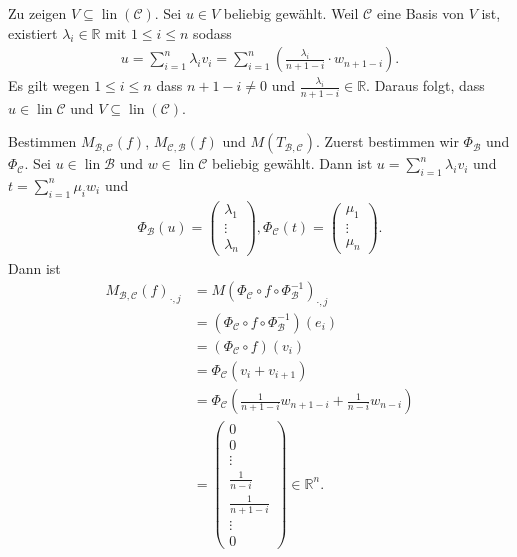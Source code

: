 \documentclass[12pt]{extarticle}
\newcommand{\mg}[1]{\mathbb{#1}}
\newcommand{\mc}[1]{\mathcal{#1}}
\newcommand{\lin}{\operatorname{lin}}
\begin{document}
Zu zeigen \(V \subseteq \lin(\mc{C})\).  Sei \(u \in V\)
beliebig gewählt.  Weil \(\mc{C}\) eine Basis von \(V\) ist, existiert
\(\lambda_i \in \mg{R}\) mit \(1 \le i \le n\) sodass
\begin{align*}
u = \sum_{i=1}^n{\lambda_i v_i} = \sum_{i =
  1}^n{\left( \frac{\lambda_i}{n+1-i} \cdot w_{n+1-i}  \right)}.
\end{align*}
Es gilt wegen \(1 \le i \le n\) dass \(n+1-i \ne 0\) und
\(\frac{\lambda_i}{n+1-i} \in \mg{R}\).  Daraus folgt,
dass \(u \in \lin \mc{C}\) und \(V \subseteq \lin(\mc{C})\).

Bestimmen \(M_{\mc{B}, \mc{C}}(f)\),
\(M_{\mc{C}, \mc{B}}(f)\) und \(M(T_{\mc{B}, \mc{C}})\).
Zuerst bestimmen wir \(\Phi_{\mc{B}}\) und \(\Phi_{\mc{C}}\).
Sei \(u \in \lin \mc{B}\) und
\(w \in \lin \mc{C}\)
beliebig gewählt.  Dann ist
\(u = \sum_{i=1}^n{\lambda_i v_i}\) und $t = \sum_{i =
  1}^n{\mu_i w_i}$ und
\begin{align*}
\Phi_\mc{B}(u) =
\begin{pmatrix}
  \lambda_1 \\
  \vdots \\
  \lambda_n
\end{pmatrix},
\Phi_\mc{C}(t) =
\begin{pmatrix}
  \mu_1 \\
  \vdots \\
  \mu_n
\end{pmatrix}.
\end{align*}
Dann ist
\begin{align*}
  M_{\mc{B}, \mc{C}}(f)_{\cdot , j}
  &= M(\Phi_{\mc{C}} \circ f \circ
    \Phi_{\mc{B}}^{-1})_{\cdot, j} \\
  &= (\Phi_{\mc{C}} \circ f \circ
    \Phi_{\mc{B}}^{-1})(e_i) \\
  &= (\Phi_{\mc{C}} \circ f)(v_i) \\
  &= \Phi_{\mc{C}}(v_i + v_{i+1}) \\
  &= \Phi_{\mc{C}} \left( \frac{1}{n+1-i}w_{n+1-i} + \frac{1}{n-i}w_{n-i} \right) \\
  &=
\begin{pmatrix}
  0 \\
  0 \\
  \vdots \\
  \frac{1}{n-i} \\
  \frac{1}{n+1-i} \\
  \vdots \\
  0
\end{pmatrix} \in \mg{R}^n.
\end{align*}
\end{document}
